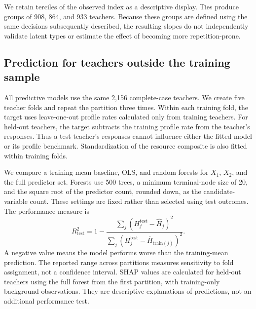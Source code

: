 
We retain terciles of the observed index as a descriptive display. Ties produce groups of 908, 864, and 933 teachers. Because these groups are defined using the same decisions subsequently described, the resulting slopes do not independently validate latent types or estimate the effect of becoming more repetition-prone.

\begin{addition}
\subsection{Prediction for teachers outside the training sample}
All predictive models use the same 2,156 complete-case teachers. We create five teacher folds and repeat the partition three times. Within each training fold, the target uses leave-one-out profile rates calculated only from training teachers. For held-out teachers, the target subtracts the training profile rate from the teacher's responses. Thus a test teacher's responses cannot influence either the fitted model or its profile benchmark. Standardization of the resource composite is also fitted within training folds.

We compare a training-mean baseline, OLS, and random forests for $X_1$, $X_2$, and the full predictor set. Forests use 500 trees, a minimum terminal-node size of 20, and the square root of the predictor count, rounded down, as the candidate-variable count. These settings are fixed rather than selected using test outcomes. The performance measure is
\[
 R^2_{\mathrm{test}}=1-\frac{\sum_j(H_j^{\mathrm{test}}-\widehat H_j)^2}{\sum_j(H_j^{\mathrm{test}}-\overline H_{\mathrm{train}(j)})^2}.
\]
A negative value means the model performs worse than the training-mean prediction. The reported range across partitions measures sensitivity to fold assignment, not a confidence interval. SHAP values are calculated for held-out teachers using the full forest from the first partition, with training-only background observations. They are descriptive explanations of predictions, not an additional performance test.
\end{addition}

